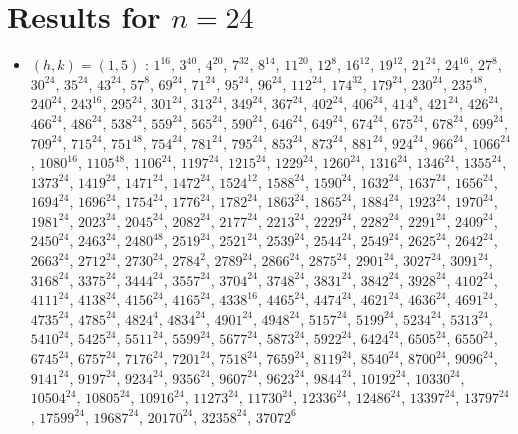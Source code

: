 \section{Results for $n=24$}
\begin{itemize}
\item $(h,k)=(1,5)$ : $1^{16}$, $3^{40}$, $4^{20}$, $7^{32}$, $8^{14}$, $11^{20}$, $12^{8}$, $16^{12}$, $19^{12}$, $21^{24}$, $24^{16}$, $27^{8}$, $30^{24}$, $35^{24}$, $43^{24}$, $57^{8}$, $69^{24}$, $71^{24}$, $95^{24}$, $96^{24}$, $112^{24}$, $174^{32}$, $179^{24}$, $230^{24}$, $235^{48}$, $240^{24}$, $243^{16}$, $295^{24}$, $301^{24}$, $313^{24}$, $349^{24}$, $367^{24}$, $402^{24}$, $406^{24}$, $414^{8}$, $421^{24}$, $426^{24}$, $466^{24}$, $486^{24}$, $538^{24}$, $559^{24}$, $565^{24}$, $590^{24}$, $646^{24}$, $649^{24}$, $674^{24}$, $675^{24}$, $678^{24}$, $699^{24}$, $709^{24}$, $715^{24}$, $751^{48}$, $754^{24}$, $781^{24}$, $795^{24}$, $853^{24}$, $873^{24}$, $881^{24}$, $924^{24}$, $966^{24}$, $1066^{24}$, $1080^{16}$, $1105^{48}$, $1106^{24}$, $1197^{24}$, $1215^{24}$, $1229^{24}$, $1260^{24}$, $1316^{24}$, $1346^{24}$, $1355^{24}$, $1373^{24}$, $1419^{24}$, $1471^{24}$, $1472^{24}$, $1524^{12}$, $1588^{24}$, $1590^{24}$, $1632^{24}$, $1637^{24}$, $1656^{24}$, $1694^{24}$, $1696^{24}$, $1754^{24}$, $1776^{24}$, $1782^{24}$, $1863^{24}$, $1865^{24}$, $1884^{24}$, $1923^{24}$, $1970^{24}$, $1981^{24}$, $2023^{24}$, $2045^{24}$, $2082^{24}$, $2177^{24}$, $2213^{24}$, $2229^{24}$, $2282^{24}$, $2291^{24}$, $2409^{24}$, $2450^{24}$, $2463^{24}$, $2480^{48}$, $2519^{24}$, $2521^{24}$, $2539^{24}$, $2544^{24}$, $2549^{24}$, $2625^{24}$, $2642^{24}$, $2663^{24}$, $2712^{24}$, $2730^{24}$, $2784^{2}$, $2789^{24}$, $2866^{24}$, $2875^{24}$, $2901^{24}$, $3027^{24}$, $3091^{24}$, $3168^{24}$, $3375^{24}$, $3444^{24}$, $3557^{24}$, $3704^{24}$, $3748^{24}$, $3831^{24}$, $3842^{24}$, $3928^{24}$, $4102^{24}$, $4111^{24}$, $4138^{24}$, $4156^{24}$, $4165^{24}$, $4338^{16}$, $4465^{24}$, $4474^{24}$, $4621^{24}$, $4636^{24}$, $4691^{24}$, $4735^{24}$, $4785^{24}$, $4824^{4}$, $4834^{24}$, $4901^{24}$, $4948^{24}$, $5157^{24}$, $5199^{24}$, $5234^{24}$, $5313^{24}$, $5410^{24}$, $5425^{24}$, $5511^{24}$, $5599^{24}$, $5677^{24}$, $5873^{24}$, $5922^{24}$, $6424^{24}$, $6505^{24}$, $6550^{24}$, $6745^{24}$, $6757^{24}$, $7176^{24}$, $7201^{24}$, $7518^{24}$, $7659^{24}$, $8119^{24}$, $8540^{24}$, $8700^{24}$, $9096^{24}$, $9141^{24}$, $9197^{24}$, $9234^{24}$, $9356^{24}$, $9607^{24}$, $9623^{24}$, $9844^{24}$, $10192^{24}$, $10330^{24}$, $10504^{24}$, $10805^{24}$, $10916^{24}$, $11273^{24}$, $11730^{24}$, $12336^{24}$, $12486^{24}$, $13397^{24}$, $13797^{24}$, $17599^{24}$, $19687^{24}$, $20170^{24}$, $32358^{24}$, $37072^{6}$

\end{itemize}
